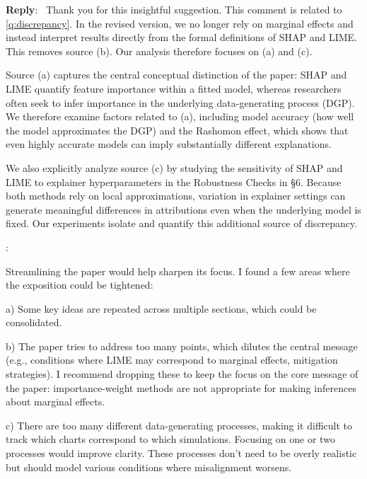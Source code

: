 \documentclass[11pt]{article}
\newcounter{se}[section]
\newcounter{reviewer}
\newcounter{point}[reviewer]
\renewcommand{\thepoint}{R\,\thereviewer.\arabic{point}}
\newenvironment{point}{
    \refstepcounter{point} \bigskip \noindent {\textbf{\thepoint}}: \rmfamily \itshape
}{\medskip}
\newenvironment{reply}
 {\par\medskip \noindent \begin{sf}\textbf{Reply}:\ }
 {\medskip \end{sf}}
\begin{document}
\begin{reply}
Thank you for this insightful suggestion. This comment is related to \ref{q:discrepancy}. In the revised version, we no longer rely on marginal effects and instead interpret results directly from the formal definitions of SHAP and LIME. This removes source (b). Our analysis therefore focuses on (a) and (c).

Source (a) captures the central conceptual distinction of the paper: SHAP and LIME quantify feature importance within a fitted model, whereas researchers often seek to infer importance in the underlying data-generating process (DGP). We therefore examine factors related to (a), including model accuracy (how well the model approximates the DGP) and the Rashomon effect, which shows that even highly accurate models can imply substantially different explanations.

We also explicitly analyze source (c) by studying the sensitivity of SHAP and LIME to explainer hyperparameters in the Robustness Checks in \S 6. Because both methods rely on local approximations, variation in explainer settings can generate meaningful differences in attributions even when the underlying model is fixed. Our experiments isolate and quantify this additional source of discrepancy.
\end{reply}

\vspace{-0.5cm}
\begin{point}
Streamlining the paper would help sharpen its focus. I found a few areas where the exposition could be tightened:

a) Some key ideas are repeated across multiple sections, which could be consolidated.

b) The paper tries to address too many points, which dilutes the central message (e.g., conditions where LIME may correspond to marginal effects, mitigation strategies). I recommend dropping these to keep the focus on the core message of the paper: importance-weight methods are not appropriate for making inferences about marginal effects.

c) There are too many different data-generating processes, making it difficult to track which charts correspond to which simulations. Focusing on one or two processes would improve clarity. These processes don’t need to be overly realistic but should model various conditions where misalignment worsens.
\end{point}
\end{document}
